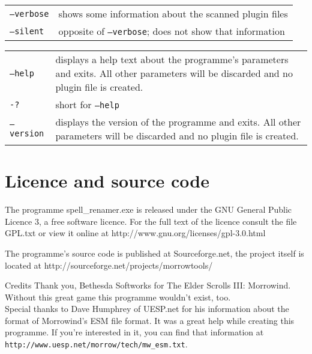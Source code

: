 \documentclass[12pt,oneside,a4paper]{article}
\begin{document}
\newline
\begin{tabular}{p{7cm} p{8cm}}
\texttt{--verbose}                & shows some information about the scanned plugin files\\
\texttt{--silent}                 & opposite of \texttt{--verbose}; does not show that information\\
\end{tabular}
\newline
\begin{tabular}{p{7cm} p{8cm}}
\texttt{--help}                   & displays a help text about the programme's parameters and exits. All other parameters will be discarded and no plugin file is created.\\
\texttt{-?}                       & short for \texttt{--help}\\
\texttt{--version}                & displays the version of the programme and exits. All other parameters will be discarded and no plugin file is created.\\
\end{tabular}

\section{Licence and source code}
The programme spell\_renamer.exe is released under the GNU General Public Licence 3,
a free software licence. For the full text of the licence consult the file GPL.txt
or view it online at http://www.gnu.org/licenses\slash gpl-3.0.html

The programme's source code is published at Sourceforge.net, the project itself
is located at http://sourceforge.net/projects/morrowtools/

\begin{section}{Credits}
Thank you, Bethesda Softworks for The Elder Scrolls III: Morrowind.
Without this great game this programme wouldn't exist, too.\\
Special thanks to Dave Humphrey of UESP.net for his information about the format
of Morrowind's ESM file format. It was a great help while creating this programme.
If you're interested in it, you can find that information at  \texttt{http://www.uesp.net\slash morrow\slash tech\slash{}mw\_esm.txt}.
\end{section}
\end{document}
